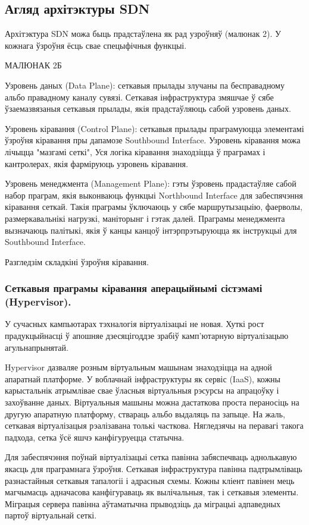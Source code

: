 \subsection{Агляд архітэктуры SDN}

Архітэктура SDN можа быць прадстаўлена як рад узроўняў (малюнак 2).
У кожнага ўзроўня ёсць свае спецыфічныя функцыі.
\begin{center}
МАЛЮНАК 2Б
\end{center}

Узровень даных (Data Plane): сеткавыя прылады злучаны па бесправадному альбо
правадному каналу сувязі. Сеткавая інфраструктура змяшчае ў сябе ўзаемазвязаныя
сеткавыя прылады, якія прадстаўляюць сабой узровень даных.

Узровень кіравання (Control Plane): сеткавыя прылады праграмуюцца элементамі
ўзроўня кіравання пры дапамозе Southbound Interface. Узровень кіравання
можа лічыцца "мазгамі сеткі", Уся логіка кіравання знаходзіцца ў праграмах і кантролерах,
якія фарміруюць узровень кіравання.

Узровень менеджмента (Management Plane): гэты ўзровень прадастаўляе сабой
набор праграм, якія выконваюць функцыі Northbound Interface для забеспячэння
кіравання сеткай. Такія праграмы ўключаюць у сябе маршрутызацыію, фаерволы,
размеркавальнікі нагрузкі, маніторынг і гэтак далей.
Праграмы менеджмента вызначаюць палітыкі, якія ў канцы канцоў інтэрпрэтыруюцца
як інструкцыі для Southbound Interface.

Разгледзім складкіні ўзроўня кіравання.

\subsubsection{Сеткавыя праграмы кіравання аперацыйнымі сістэмамі (Hypervisor).}
У сучасных кампьютарах тэхналогія віртуалізацыі не новая.
Хуткі рост прадукцыйнасці ў апошняе дзесяцігоддзе зрабіў камп'ютарную віртуалізацыю
агульнапрынятай.

Hypervisor дазваляе розным віртуальным машынам знаходзіцца на адной апаратнай платформе. У воблачнай інфраструктуры як сервіс (IaaS), кожны карыстальнік
атрымлівае свае ўласныя віртуальныя рэсурсы на апрацоўку і захоўванне даных.
Віртуальныя машыны можна дастаткова проста пераносіць на другую апаратную платформу,
ствараць альбо выдаляць па запыце. На жаль, сеткавая віртуалізацыя рэалізавана
толькі часткова. Нягледзячы на перавагі такога падхода, сетка ўсё яшчэ канфігуруецца статычна.

Для забеспячэння поўнай віртуалізацыі сетка павінна забяспечваць аднолькавую якасць
для праграмнага ўзроўня. Сеткавая інфраструктура павінна падтрымліваць разнастайныя
сеткавыя тапалогіі і адрасныя схемы. Кожны кліент павінен мець магчымасць
адначасова канфігураваць як вылічальныя, так і сеткавыя элементы. Міграцыя сервера
павінна аўтаматычна прыводзіць да міграцыі адпаведных партоў віртуальнай сеткі.

